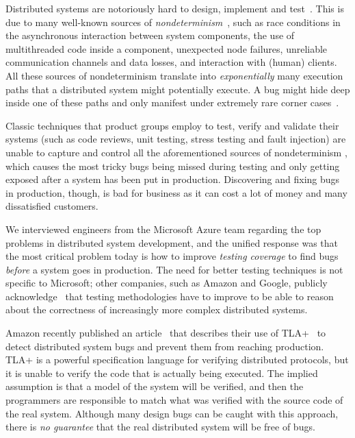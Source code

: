 Distributed systems are notoriously hard to design, implement and test~\cite{cavage2013there, laguna2015debugging, maddox2015test}. This is due to many well-known sources of \emph{nondeterminism}~\cite{chandra2007paxos}, such as race conditions in the asynchronous interaction between system components, the use of multithreaded code inside a component, unexpected node failures, unreliable communication channels and data losses, and interaction with (human) clients.
%
All these sources of nondeterminism translate into \emph{exponentially} many execution paths that a distributed system might potentially execute. A bug might hide deep inside one of these paths and only manifest under extremely rare corner cases~\cite{gray1986computers, musuvathi2008finding}.

Classic techniques that product groups employ to test, verify and validate their systems (such as code reviews, unit testing, stress testing and fault injection) are unable to capture and control all the aforementioned sources of nondeterminism , which causes the most tricky bugs being missed during testing and only getting exposed after a system has been put in production. Discovering and fixing bugs in production, though, is bad for business as it can cost a lot of money and many dissatisfied customers.  

We interviewed engineers from the Microsoft Azure team regarding the top problems in distributed system development, and the unified response  was that the most critical problem today is how to improve \emph{testing coverage} to find bugs \emph{before} a system goes in production. The need for better testing techniques is not specific to Microsoft; other companies, such as Amazon and Google, publicly acknowledge~\cite{newcombe2015aws} that testing methodologies have to improve to be able to reason about the correctness of increasingly more complex distributed systems.

Amazon recently published an article~\cite{newcombe2015aws} that describes their use of TLA+~\cite{lamport1994temporal} to detect distributed system bugs and prevent them from reaching production. TLA+ is a powerful specification language for verifying distributed protocols, but it is unable to verify the code that is actually being executed. The implied assumption is that a model of the system will be verified, and then the programmers are responsible to match what was verified with the source code of the real system. Although many design bugs can be caught with this approach, there is \emph{no guarantee} that the real distributed system will be free of bugs.

